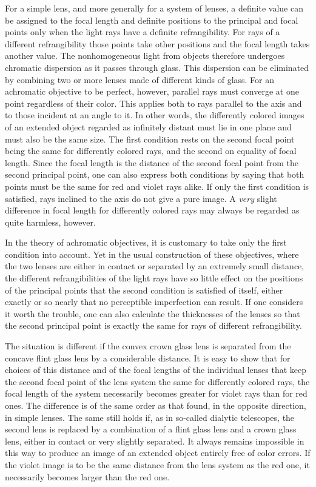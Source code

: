 For a simple lens, and more generally for a system of lenses, a definite value can be assigned to the focal length and definite positions to the principal and focal points only when the light rays have a definite refrangibility. For rays of a different refrangibility those points take other positions and the focal length takes another value. The nonhomogeneous light from objects therefore undergoes chromatic dispersion as it passes through glass. This dispersion can be eliminated by combining two or
more lenses made of different kinds of glass. For an achromatic objective to be perfect, however, parallel rays must converge at one point regardless of their color. This applies both to rays parallel to the axis and to those incident at an angle to it. In other words, the differently colored images of an extended object regarded as infinitely distant must lie in one plane and must also be the same size. The first condition rests on the second focal point being the same for differently colored rays, and the second on equality of focal length. Since the focal length is the distance of the second focal point from the second principal point, one can also express both conditions by saying that both points must be the same for red and violet rays alike. If only the first condition is satisfied, rays inclined to the axis do not give a pure image. A \textit{very} slight difference in focal length for differently colored rays may always be regarded as quite harmless, however.

In the theory of achromatic objectives, it is customary to take only the first condition into account. Yet in the usual construction of these objectives, where the two lenses are either in contact or separated by an extremely small distance, the different refrangibilities of the light rays have so little effect on the positions of the principal points that the second condition is satisfied of itself, either exactly or so nearly that no perceptible imperfection can result. If one considers it worth the trouble, one can also calculate the thicknesses of the lenses so that the second principal point is exactly the same for rays of different refrangibility.

The situation is different if the convex crown glass lens is separated from the concave flint glass lens by a considerable distance. It is easy to show that for choices of this distance and of the focal lengths of the individual lenses that keep the second focal point of the lens system the same for differently colored rays, the focal length of the system necessarily becomes greater for violet rays than for red ones. The difference is of the same order as that found, in the opposite direction, in simple lenses. The same still holds if, as in so-called dialytic telescopes, the second lens is replaced by
a combination of a flint glass lens and a crown glass lens, either in contact or very slightly separated. It always remains impossible in this way to produce an image of an extended object entirely free of color errors. If the violet image is to be the same distance from the lens system as the red one, it necessarily becomes larger than the red one.


